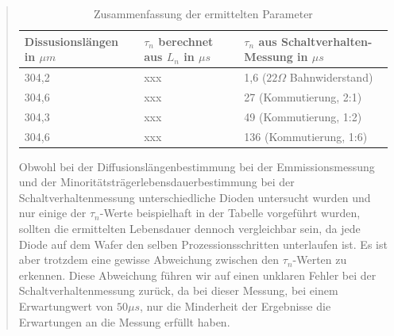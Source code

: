 \begin{quote}
    \begin{table}[H]
              \begin{addmargin}[-0.5cm]{3cm}
                \centering
                   \begin{tabular}{|p{5cm}|p{5cm}|p{5cm}|}
                    \hline
                    Dissusionslängen in $\mu m$ &  $\tau_n$ berechnet aus $L_n$
                    in $\mu s$ & $\tau_n$ aus Schaltverhalten-Messung in $\mu s$\\
                    \hline
                    304,2  & xxx &  1,6 ($22 \Omega$ Bahnwiderstand)\\
                    \hline
                    304,6  & xxx &  27 (Kommutierung, 2:1)\\
                    \hline
                    304,3  & xxx &  49 (Kommutierung, 1:2)\\
                    \hline
                    304,6  & xxx &  136 (Kommutierung, 1:6)\\
                    \hline

                    \end{tabular}
              \end{addmargin}
              \caption{Zusammenfassung der ermittelten Parameter}
              \label{tab:werte}
            \end{table}
            
    Obwohl bei der Diffusionslängenbestimmung bei der Emmissionsmessung und der
    Minoritätsträgerlebensdauerbestimmung bei der Schaltverhaltenmessung
    unterschiedliche Dioden untersucht wurden und nur einige der $\tau_n$-Werte
    beispielhaft in der Tabelle vorgeführt wurden, sollten die ermittelten
    Lebensdauer dennoch vergleichbar sein, da jede Diode auf dem Wafer den
    selben Prozessionsschritten unterlaufen ist. Es ist aber trotzdem eine
    gewisse Abweichung zwischen den $\tau_n$-Werten zu erkennen. 
    Diese Abweichung führen wir auf einen unklaren Fehler bei der Schaltverhaltenmessung zurück, da
    bei dieser Messung, bei einem Erwartungwert von $50 \mu s$, nur die
    Minderheit der Ergebnisse die Erwartungen an die Messung erfüllt haben.
                
            
\end{quote}

\newpage


